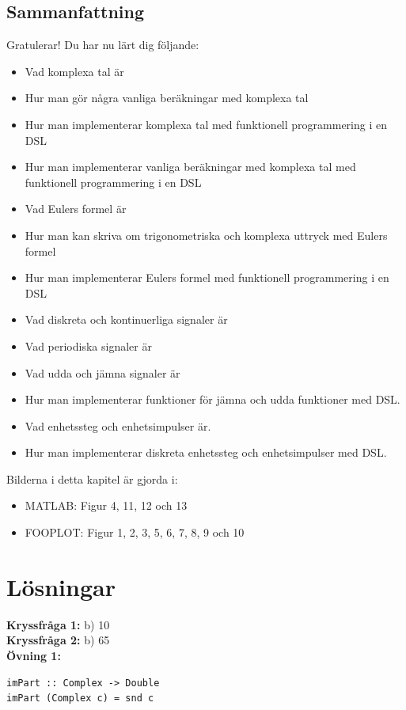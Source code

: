 \documentclass{article}
\begin{document}
\subsection{Sammanfattning}
Gratulerar! Du har nu lärt dig följande:
\begin{itemize}
\item Vad komplexa tal är
\item Hur man gör några vanliga beräkningar med komplexa tal
\item Hur man implementerar komplexa tal med funktionell programmering i en DSL
\item Hur man implementerar vanliga beräkningar med komplexa tal med
  funktionell programmering i en DSL
\item Vad Eulers formel är
\item Hur man kan skriva om trigonometriska och komplexa uttryck med Eulers formel
\item Hur man implementerar Eulers formel med funktionell programmering i en DSL
\item Vad diskreta och kontinuerliga signaler är
\item Vad periodiska signaler är
\item Vad udda och jämna signaler är
\item Hur man implementerar funktioner för jämna och udda funktioner med DSL.
\item Vad enhetssteg och enhetsimpulser är.
\item Hur man implementerar diskreta enhetssteg och enhetsimpulser med DSL.
\end{itemize}

Bilderna i detta kapitel är gjorda i:
\begin{itemize}
\item MATLAB: Figur 4, 11, 12 och 13
\item FOOPLOT: Figur 1, 2, 3, 5, 6, 7, 8, 9 och 10
\end{itemize}

\newpage
\section{Lösningar}

\textbf{Kryssfråga 1:} b) 10
\\

\textbf{Kryssfråga 2:} b) 65
\\

\textbf{Övning 1:}
\begin{verbatim}
imPart :: Complex -> Double
imPart (Complex c) = snd c
\end{verbatim}
\end{document}
